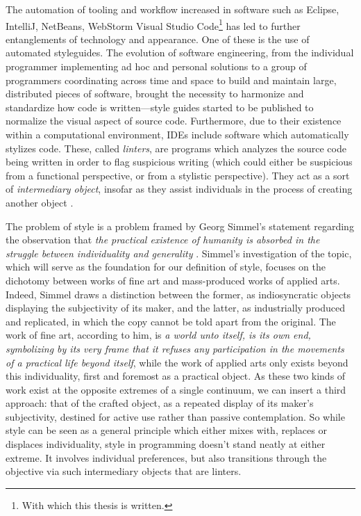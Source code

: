 The automation of tooling and workflow increased in software such as Eclipse, IntelliJ, NetBeans, WebStorm Visual Studio Code\footnote{With which this thesis is written.} has led to further entanglements of technology and appearance. One of these is the use of automated styleguides. The evolution of software engineering, from the individual programmer implementing ad hoc and personal solutions to a group of programmers coordinating across time and space to build and maintain large, distributed pieces of software, brought the necessity to harmonize and standardize how code is written—style guides started to be published to normalize the visual aspect of source code. Furthermore, due to their existence within a computational environment, IDEs include software which automatically stylizes code. These, called \emph{linters}, are programs which analyzes the source code being written in order to flag suspicious writing (which could either be suspicious from a functional perspective, or from a stylistic perspective). They act as a sort of \emph{intermediary object}, insofar as they assist individuals in the process of creating another object \citep{jeantet_objets_1998}.


The problem of style is a problem framed by Georg Simmel's statement regarding the observation that \emph{the practical existence of humanity is absorbed in the struggle between individuality and generality} \citep{simmel_problem_1991}. Simmel's investigation of the topic, which will serve as the foundation for our definition of style, focuses on the dichotomy between works of fine art and mass-produced works of applied arts. Indeed, Simmel draws a distinction between the former, as indiosyncratic objects displaying the subjectivity of its maker, and the latter, as industrially produced and replicated, in which the copy cannot be told apart from the original. The work of fine art, according to him, is \emph{a world unto itself, is its own end, symbolizing by its very frame that it refuses any participation in the movements of a practical life beyond itself}, while the work of applied arts only exists beyond this individuality, first and foremost as a practical object. As these two kinds of work exist at the opposite extremes of a single continuum, we can insert a third approach: that of the crafted object, as a repeated display of its maker's subjectivity, destined for active use rather than passive contemplation. So while style can be seen as a general principle which either mixes with, replaces or displaces individuality, style in programming doesn't stand neatly at either extreme. It involves individual preferences, but also transitions through the objective via such intermediary objects that are linters.

